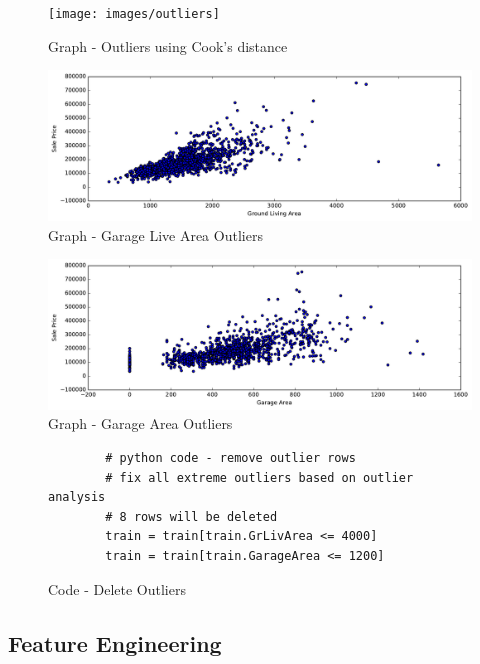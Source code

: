 \documentclass[sigconf]{acmart}
\begin{document}
	\begin{figure}[htb]
		\centering
		\texttt{[image: images/outliers]}	
		\caption{Graph - Outliers using Cook's distance} \label{fig:outliers} 
	\end{figure}
		
	\begin{figure}[htb]
	\centering
	\includegraphics[width=.95\columnwidth]{images/gr_liv_area_outlier}	
	\caption{Graph - Garage Live Area Outliers} \label{fig:gr-liv-area-outlier} 
	\end{figure}

	\begin{figure}[htb]
	\centering
	\includegraphics[width=.95\columnwidth]{images/garage_area_outlier}	
	\caption{Graph - Garage Area Outliers} \label{fig:garage-area-outlier} 
	\end{figure}

	\begin{figure}[htb]				
		\begin{verbatim}	
		# python code - remove outlier rows
		# fix all extreme outliers based on outlier analysis
		# 8 rows will be deleted
		train = train[train.GrLivArea <= 4000]
		train = train[train.GarageArea <= 1200]
		\end{verbatim}
		\caption{Code - Delete Outliers} \label{c:code-del-outliers} 
	\end{figure}

	\subsection{Feature Engineering}
	
\end{document}
